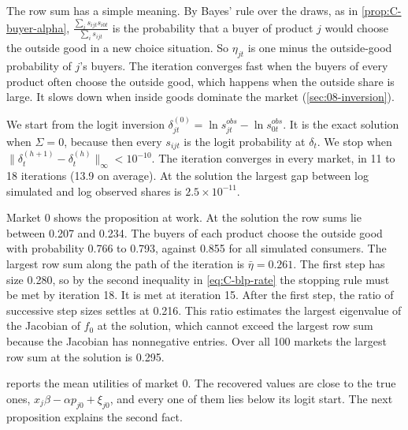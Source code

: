 The row sum has a simple meaning. By Bayes' rule over the draws, as in \cref{prop:C-buyer-alpha},
$\frac{\sum_is_{ijt}s_{i0t}}{\sum_is_{ijt}}$ is the probability that a buyer of product $j$ would choose the outside
good in a new choice situation. So $\eta_{jt}$ is one minus the outside-good probability of $j$'s buyers. The
iteration converges fast when the buyers of every product often choose the outside good, which happens when the outside
share is large. It slows down when inside goods dominate the market (\cref{sec:08-inversion}).

We start from the logit inversion $\delta^{(0)}_{jt} = \ln s^{obs}_{jt} - \ln s^{obs}_{0t}$. It is the exact solution
when $\Sigma = 0$, because then every $s_{ijt}$ is the logit probability at $\delta_t$. We stop when
$\|\delta^{(h+1)}_t - \delta^{(h)}_t\|_\infty < 10^{-10}$. The iteration converges in every market, in 11 to 18
iterations (13.9 on average). At the solution the largest gap between log simulated and log observed shares is
$2.5\times10^{-11}$.

Market 0 shows the proposition at work. At the solution the row sums lie between 0.207 and 0.234. The buyers of each
product choose the outside good with probability 0.766 to 0.793, against 0.855 for all simulated consumers. The largest
row sum along the path of the iteration is $\bar\eta = 0.261$. The first step has size 0.280, so by the second
inequality in \eqref{eq:C-blp-rate} the stopping rule must be met by iteration 18. It is met at iteration 15. After the
first step, the ratio of successive step sizes settles at 0.216. This ratio estimates the largest eigenvalue of the
Jacobian of $f_0$ at the solution, which cannot exceed the largest row sum because the Jacobian has nonnegative
entries. Over all 100 markets the largest row sum at the solution is 0.295.

 reports the mean utilities of market 0. The recovered values are close to the true ones,
$x_{j}\beta - \alpha p_{j0} + \xi_{j0}$, and every one of them lies below its logit start. The next proposition
explains the second fact.

